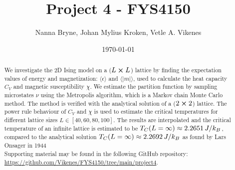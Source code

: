 



\title{Project 4 - FYS4150} 
\author{Nanna Bryne, Johan Mylius Kroken, Vetle A. Vikenes} 
\date{\today}                             
\noaffiliation                            

\begin{abstract}
    We investigate the 2D Ising model on a ($L\cross L$) lattice by finding the expectation values of energy and magnetization: $\langle \epsilon \rangle$ and $\langle \vert m \vert \rangle$, used to calculate the heat capacity $C_V$ and magnetic susceptibility $\chi$. We estimate the partition function by sampling microstates $\nu$ using the Metropolis algorithm, which is a Markov chain Monte Carlo method. The method is verified with the analytical solution of a ($2\cross2$) lattice. The power rule behaviour of $C_V$ and $\chi$ is used to estimate the critical temperatures for different lattice sizes $L\in[40,60,80,100]$. The results are interpolated and the critical temperature of an infinite lattice is estimated to be $T_C(L=\infty) \approx 2.2651\,J/k_B$, compared to the analytical solution $T_C(L=\infty) \approx 2.2692\,J/k_B$ as found by Lars Onsager in 1944 \cite{Onsager_Ising2D}\\
    Supporting material may be found in the following GitHub repository: \url{https://github.com/Vikenes/FYS4150/tree/main/project4}.
\end{abstract}
\maketitle
















\newpage


\newpage

 



